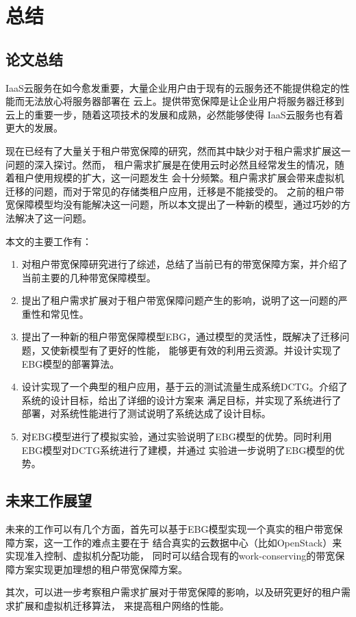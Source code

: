 

\chapter{总结}
\label{conclu} 
\section{论文总结}
IaaS云服务在如今愈发重要，大量企业用户由于现有的云服务还不能提供稳定的性能而无法放心将服务器部署在
云上。提供带宽保障是让企业用户将服务器迁移到云上的重要一步，随着这项技术的发展和成熟，必然能够使得
IaaS云服务也有着更大的发展。

现在已经有了大量关于租户带宽保障的研究，然而其中缺少对于租户需求扩展这一问题的深入探讨。然而，
租户需求扩展是在使用云时必然且经常发生的情况，随着租户使用规模的扩大，这一问题发生
会十分频繁。租户需求扩展会带来虚拟机迁移的问题，而对于常见的存储类租户应用，迁移是不能接受的。
之前的租户带宽保障模型均没有能解决这一问题，所以本文提出了一种新的模型，通过巧妙的方法解决了这一问题。

本文的主要工作有：

\begin{enumerate}
\item 对租户带宽保障研究进行了综述，总结了当前已有的带宽保障方案，并介绍了当前主要的几种带宽保障模型。
\item 提出了租户需求扩展对于租户带宽保障问题产生的影响，说明了这一问题的严重性和常见性。
\item 提出了一种新的租户带宽保障模型EBG，通过模型的灵活性，既解决了迁移问题，又使新模型有了更好的性能，
能够更有效的利用云资源。并设计实现了EBG模型的部署算法。
\item 设计实现了一个典型的租户应用，基于云的测试流量生成系统DCTG。介绍了系统的设计目标，给出了详细的设计方案来
满足目标，并实现了系统进行了部署，对系统性能进行了测试说明了系统达成了设计目标。
\item 对EBG模型进行了模拟实验，通过实验说明了EBG模型的优势。同时利用EBG模型对DCTG系统进行了建模，并通过
实验进一步说明了EBG模型的优势。
\end{enumerate}

\section{未来工作展望}
未来的工作可以有几个方面，首先可以基于EBG模型实现一个真实的租户带宽保障方案，这一工作的难点主要在于
结合真实的云数据中心（比如OpenStack）来实现准入控制、虚拟机分配功能，
同时可以结合现有的work-conserving的带宽保障方案实现更加理想的租户带宽保障方案。

其次，可以进一步考察租户需求扩展对于带宽保障的影响，以及研究更好的租户需求扩展和虚拟机迁移算法，
来提高租户网络的性能。